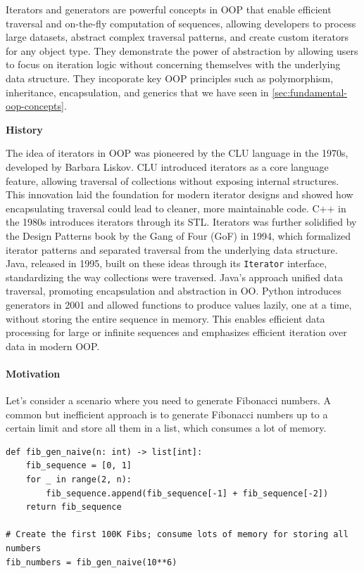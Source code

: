 \documentclass[oneside,11pt,dvipsnames]{book}
\newenvironment{historybox}[1][]{
  \small
  \begin{myhistorybox}
    {\small \textbf{#1}}
  }{
  \end{myhistorybox}
}
\newcommand{\code}[1]{\texttt{#1}}
\begin{document}
Iterators and generators are powerful concepts in OOP that enable efficient traversal and on-the-fly computation of sequences, allowing developers to process large datasets, abstract complex traversal patterns, and create custom iterators for any object type. 
They demonstrate the power of abstraction by allowing users to focus on iteration logic without concerning themselves with the underlying data structure. They incoporate key OOP principles such as polymorphism, inheritance, encapsulation, and generics that we have seen in \autoref{sec:fundamental-oop-concepts}.



\begin{historybox}[History]
    The idea of iterators in OOP was pioneered by the CLU language in the 1970s, developed by Barbara Liskov. CLU introduced iterators as a core language feature, allowing traversal of collections without exposing internal structures. This innovation laid the foundation for modern iterator designs and showed how encapsulating traversal could lead to cleaner, more maintainable code. C++ in the 1980s introduces iterators through its STL. Iterators was further solidified by the Design Patterns book by the Gang of Four (GoF) in 1994, which formalized iterator patterns and separated traversal from the underlying data structure.\\
    
    Java, released in 1995, built on these ideas through its \code{Iterator} interface, standardizing the way collections were traversed. Java's approach unified data traversal, promoting encapsulation and abstraction in OO. Python introduces generators in 2001 and allowed functions to produce values lazily, one at a time, without storing the entire sequence in memory. This enables efficient data processing for large or infinite sequences and emphasizes efficient iteration over data in modern OOP.
\end{historybox}
\paragraph{Motivation} Let’s consider a scenario where you need to generate Fibonacci numbers. A common but inefficient approach is to generate Fibonacci numbers up to a certain limit and store all them in a list, which consumes a lot of memory.

\begin{lstlisting}
def fib_gen_naive(n: int) -> list[int]:
    fib_sequence = [0, 1]
    for _ in range(2, n):
        fib_sequence.append(fib_sequence[-1] + fib_sequence[-2])
    return fib_sequence

# Create the first 100K Fibs; consume lots of memory for storing all numbers
fib_numbers = fib_gen_naive(10**6)  
\end{lstlisting}
\end{document}
